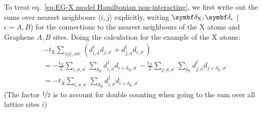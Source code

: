 \documentclass[../notes.tex]{subfiles}
\begin{document}
To treat eq.~\ref{eq:EG-X model Hamiltonian non-interacting}, we first write out the sums over nearest neighbours \(\langle i, j \rangle\) explicitly, writing \(\vb{\delta}_{\mathrm{X}}, \vb{\delta}_{\epsilon}\) (\(\epsilon = A, B\)) for the connections to the nearest neighbours of the \(\mathrm{X}\) atoms and Graphene \(A, B\) sites.
Doing the calculation for the example of the \(\mathrm{X}\) atoms:
\begin{align}
	&-t_{\mathrm{X}} \sum_{\langle ij \rangle, \sigma \sigma^{\prime}} (d_{i, \sigma}^{\dagger} d_{j, \sigma^{\prime}} + d_{j, \sigma}^{\dagger} d_{i, \sigma^{\prime}}) \\
	&= -\frac{t_X}{2} \sum_{i,\sigma, \sigma^{\prime}} \sum_{\delta_{\mathrm{X}}} d_{i, \sigma}^{\dagger} d_{i + \delta_{\mathrm{X}}, \sigma^{\prime}}
	-\frac{t_X}{2} \sum_{j,\sigma, \sigma^{\prime}} \sum_{\delta_{\mathrm{X}}} d_{j, \sigma}^{\dagger} d_{j + \delta_{\mathrm{X}}, \sigma^{\prime}} \\
	&= -t_X \sum_{i,\sigma, \sigma^{\prime}} \sum_{\delta_{\mathrm{X}}} d_{i, \sigma}^{\dagger} d_{i + \delta_{\mathrm{X}}, \sigma^{\prime}}
	\label{eq:EG-X model X atoms nearest neighbours written out}
\end{align}
(The factor \(\nicefrac{1}{2}\) is to account for double counting when going to the sum over all lattice sites \(i\))
\end{document}
